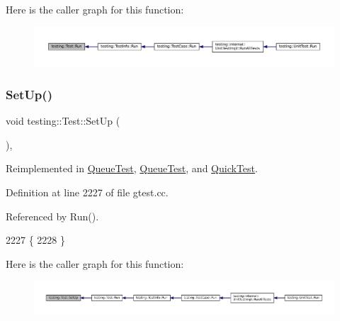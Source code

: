 Here is the caller graph for this function\+:
\nopagebreak
\begin{figure}[H]
\begin{center}
\leavevmode
\includegraphics[width=350pt]{classtesting_1_1Test_a939ae280a6f2f1c3d43708ec616684ed_icgraph}
\end{center}
\end{figure}
\mbox{\label{classtesting_1_1Test_a57a4116f39f6636a80710ded7d42e889}} 
\subsubsection{\texorpdfstring{Set\+Up()}{SetUp()}}
{\footnotesize\ttfamily void testing\+::\+Test\+::\+Set\+Up (\begin{DoxyParamCaption}{ }\end{DoxyParamCaption})\hspace{0.3cm}{\ttfamily [protected]}, {\ttfamily [virtual]}}



Reimplemented in \hyperlink{classQueueTest_a91e69958f086239a523864d6b94ab174}{Queue\+Test}, \hyperlink{classQueueTest_a91e69958f086239a523864d6b94ab174}{Queue\+Test}, and \hyperlink{classQuickTest_ae52ad082887512b92240ce40a1a05650}{Quick\+Test}.



Definition at line 2227 of file gtest.\+cc.



Referenced by Run().


\begin{DoxyCode}
2227                  \{
2228 \}
\end{DoxyCode}
Here is the caller graph for this function\+:
\nopagebreak
\begin{figure}[H]
\begin{center}
\leavevmode
\includegraphics[width=350pt]{classtesting_1_1Test_a57a4116f39f6636a80710ded7d42e889_icgraph}
\end{center}
\end{figure}
\mbox{\label{classtesting_1_1Test_a65c1626d50b7dd1a1d759dc6c3f72d4c}} 
